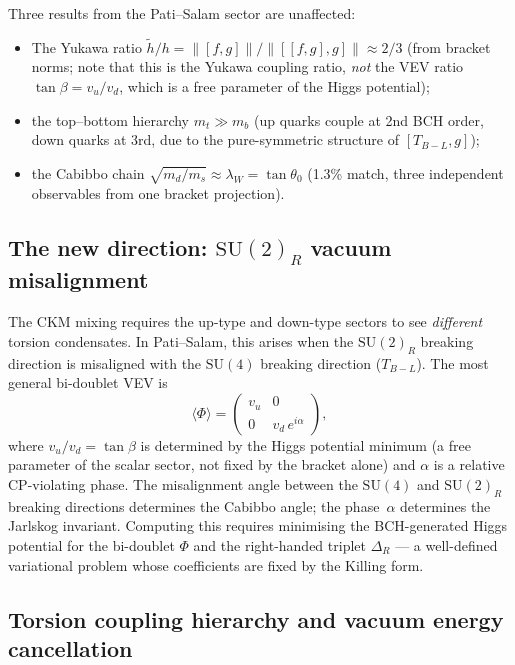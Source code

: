 \documentclass[11pt,a4paper]{article}
\theoremstyle{plain}
\theoremstyle{definition}
\theoremstyle{remark}
\begin{document}
Three results from the Pati--Salam sector are unaffected:
\begin{itemize}[noitemsep]
  \item The Yukawa ratio $\tilde{h}/h = \|[f,g]\| / \|[[f,g],g]\| \approx 2/3$ (from
    bracket norms; note that this is the Yukawa coupling ratio, \emph{not} the VEV
    ratio $\tan\beta = v_u/v_d$, which is a free parameter of the Higgs potential);
  \item the top--bottom hierarchy $m_t \gg m_b$ (up quarks couple at
    2nd BCH order, down quarks at 3rd, due to the pure-symmetric
    structure of $[T_{B{-}L}, g]$);
  \item the Cabibbo chain $\sqrt{m_d/m_s} \approx \lambda_W = \tan\theta_0$
    (1.3\% match, three independent observables from one bracket projection).
\end{itemize}

\subsection*{The new direction: $\mathrm{SU}(2)_R$ vacuum misalignment}

The CKM mixing requires the up-type and down-type sectors to see
\emph{different} torsion condensates.  In Pati--Salam, this arises
when the $\mathrm{SU}(2)_R$ breaking direction is misaligned with the
$\mathrm{SU}(4)$ breaking direction ($T_{B{-}L}$).  The most general
bi-doublet VEV is
\[
  \langle\Phi\rangle = \begin{pmatrix} v_u & 0 \\ 0 & v_d\,e^{i\alpha} \end{pmatrix},
\]
where $v_u/v_d = \tan\beta$ is determined by the Higgs potential minimum
(a free parameter of the scalar sector, not fixed by the bracket alone) and
$\alpha$ is a relative CP-violating phase.  The misalignment angle
between the $\mathrm{SU}(4)$ and $\mathrm{SU}(2)_R$ breaking
directions determines the Cabibbo angle; the phase~$\alpha$
determines the Jarlskog invariant.  Computing this requires
minimising the BCH-generated Higgs potential for the bi-doublet
$\Phi$ and the right-handed triplet $\Delta_R$ --- a well-defined
variational problem whose coefficients are fixed by the Killing form.

\subsection{Torsion coupling hierarchy and vacuum energy cancellation}
\label{sec:torsion-hierarchy}
\end{document}
